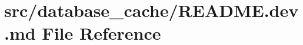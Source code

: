 \hypertarget{database__cache_2README_8dev_8md}{}\section{src/database\+\_\+cache/\+R\+E\+A\+D\+ME.dev.\+md File Reference}
\label{database__cache_2README_8dev_8md}
